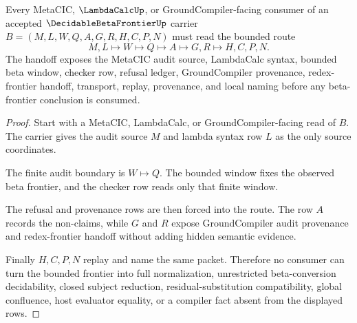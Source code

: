 \begin{theorem}
\label{thm:decidable-beta-frontier-metacic-handoff}
Every MetaCIC, $\LambdaCalcUp$, or GroundCompiler-facing consumer of an accepted $\DecidableBetaFrontierUp$ carrier $B=(M,L,W,Q,A,G,R,H,C,P,N)$ must read the bounded route
$$
M,L \longmapsto W \longmapsto Q \longmapsto A \longmapsto G,R \longmapsto H,C,P,N .
$$
The handoff exposes the MetaCIC audit source, LambdaCalc syntax, bounded beta window, checker row, refusal ledger, GroundCompiler provenance, redex-frontier handoff, transport, replay, provenance, and local naming before any beta-frontier conclusion is consumed.
\end{theorem}
\begin{proof}
Start with a MetaCIC, LambdaCalc, or GroundCompiler-facing read of $B$. The carrier gives the audit source $M$ and lambda syntax row $L$ as the only source coordinates.

The finite audit boundary is $W \longmapsto Q$. The bounded window fixes the observed beta frontier, and the checker row reads only that finite window.

The refusal and provenance rows are then forced into the route. The row $A$ records the non-claims, while $G$ and $R$ expose GroundCompiler audit provenance and redex-frontier handoff without adding hidden semantic evidence.

Finally $H,C,P,N$ replay and name the same packet. Therefore no consumer can turn the bounded frontier into full normalization, unrestricted beta-conversion decidability, closed subject reduction, residual-substitution compatibility, global confluence, host evaluator equality, or a compiler fact absent from the displayed rows.
\end{proof}

